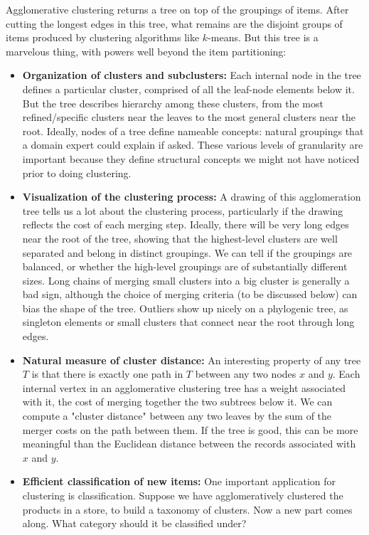 \documentclass[10pt]{article}
\begin{document}
Agglomerative clustering returns a tree on top of the groupings of items. After cutting the longest edges in this tree, what remains are the disjoint groups of items produced by clustering algorithms like $k$-means. But this tree is a marvelous thing, with powers well beyond the item partitioning:

\begin{itemize}
  \item \textbf{Organization of clusters and subclusters:} Each internal node in the tree defines a particular cluster, comprised of all the leaf-node elements below it. But the tree describes hierarchy among these clusters, from the most refined/specific clusters near the leaves to the most general clusters near the root. Ideally, nodes of a tree define nameable concepts: natural groupings that a domain expert could explain if asked. These various levels of granularity are important because they define structural concepts we might not have noticed prior to doing clustering.
  
  \item \textbf{Visualization of the clustering process:} A drawing of this agglomeration tree tells us a lot about the clustering process, particularly if the drawing reflects the cost of each merging step. Ideally, there will be very long edges near the root of the tree, showing that the highest-level clusters are well separated and belong in distinct groupings. We can tell if the groupings are balanced, or whether the high-level groupings are of substantially different sizes. Long chains of merging small clusters into a big cluster is generally a bad sign, although the choice of merging criteria (to be discussed below) can bias the shape of the tree. Outliers show up nicely on a phylogenic tree, as singleton elements or small clusters that connect near the root through long edges.
  
  \item \textbf{Natural measure of cluster distance:} An interesting property of any tree $T$ is that there is exactly one path in $T$ between any two nodes $x$ and $y$. Each internal vertex in an agglomerative clustering tree has a weight associated with it, the cost of merging together the two subtrees below it. We can compute a "cluster distance" between any two leaves by the sum of the merger costs on the path between them. If the tree is good, this can be more meaningful than the Euclidean distance between the records associated with $x$ and $y$.
  
  \item \textbf{Efficient classification of new items:} One important application for clustering is classification. Suppose we have agglomeratively clustered the products in a store, to build a taxonomy of clusters. Now a new part comes along. What category should it be classified under?


\end{itemize}
\end{document}
